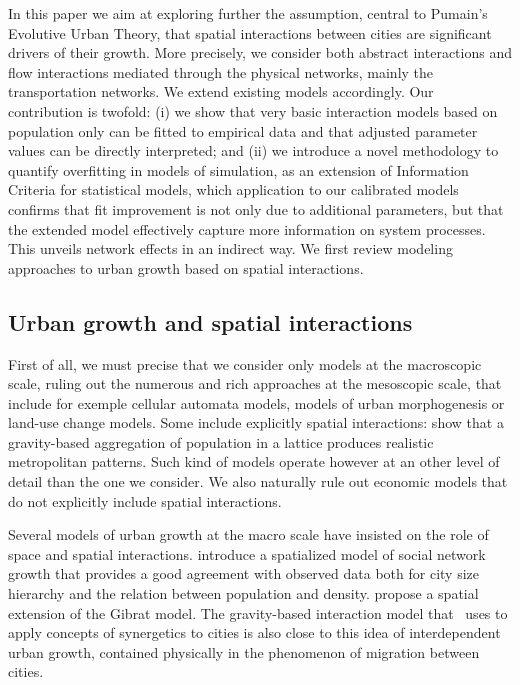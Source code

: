 \documentclass[Royal,sageh,times]{sagej}
\begin{document}
In this paper we aim at exploring further the assumption, central to Pumain's Evolutive Urban Theory, that spatial interactions between cities are significant drivers of their growth. More precisely, we consider both abstract interactions and flow interactions mediated through the physical networks, mainly the transportation networks. We extend existing models accordingly. Our contribution is twofold: (i) we show that very basic interaction models based on population only can be fitted to empirical data and that adjusted parameter values can be directly interpreted; and (ii) we introduce a novel methodology to quantify overfitting in models of simulation, as an extension of Information Criteria for statistical models, which application to our calibrated models confirms that fit improvement is not only due to additional parameters, but that the extended model effectively capture more information on system processes. This unveils network effects in an indirect way. We first review modeling approaches to urban growth based on spatial interactions.


\subsection*{Urban growth and spatial interactions}

First of all, we must precise that we consider only models at the macroscopic scale, ruling out the numerous and rich approaches at the mesoscopic scale, that include for exemple cellular automata models, models of urban morphogenesis or land-use change models. Some include explicitly spatial interactions: \cite{rybski2013distance} show that a gravity-based aggregation of population in a lattice produces realistic metropolitan patterns. Such kind of models operate however at an other level of detail than the one we consider. We also naturally rule out economic models that do not explicitly include spatial interactions.

Several models of urban growth at the macro scale have insisted on the role of space and spatial interactions. \cite{frasco2014spatially} introduce a spatialized model of social network growth that provides a good agreement with observed data both for city size hierarchy and the relation between population and density. \cite{bretagnolle2000long} propose a spatial extension of the Gibrat model. The gravity-based interaction model that~\cite{sanders1992systeme} uses to apply concepts of synergetics to cities is also close to this idea of interdependent urban growth, contained physically in the phenomenon of migration between cities. 
\end{document}
